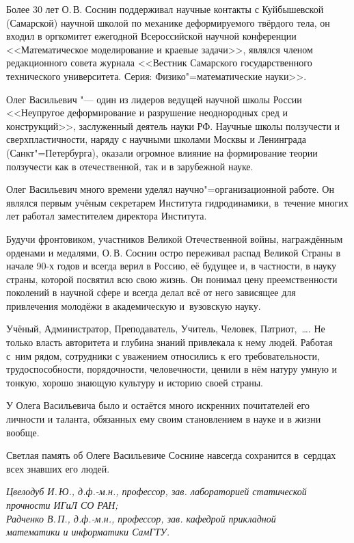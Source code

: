 Более 30 лет О.\,В. Соснин поддерживал научные контакты с Куйбышевской (Самарской) научной школой по механике деформируемого твёрдого тела, он входил в оргкомитет ежегодной Всероссийской научной конференции <<Математическое моделирование и краевые задачи>>,
являлся членом редакционного совета журнала <<Вестник Самарского государственного технического университета. Серия: Физико"=математические науки>>.

Олег Васильевич "--- один из лидеров ведущей научной школы России <<Не\-уп\-ру\-гое деформирование и разрушение неоднородных сред и конструкций>>, заслуженный деятель науки РФ. Научные школы ползучести и сверхпластичности, наряду с научными школами Москвы и Ленинграда (Санкт"=Петербурга), оказали огромное влияние на формирование теории ползучести как в отечественной, так и в зарубежной науке.


Олег Васильевич много времени уделял научно"=организационной работе. 
Он являлся первым учёным секретарем Института гидродинамики, в~течение многих лет работал заместителем директора Института.

Будучи фронтовиком, участников Великой Отечественной войны, награждённым орденами и медалями, О.\,В. Соснин остро переживал распад Великой Страны в начале 90-х годов и всегда верил в Россию, её будущее и, в частности, в науку страны, которой посвятил всю свою жизнь.
Он понимал цену преемственности поколений в научной сфере и всегда делал всё от него зависящее для привлечения молодёжи в академическую и~вузовскую науку.

Учёный, Администратор, Преподаватель, Учитель, Человек, Патриот,~\dots\/. Не только власть авторитета и глубина знаний привлекала к нему людей. Работая с~ним рядом, сотрудники с уважением относились к его требовательности, трудоспособности, порядочности, человечности, ценили в нём натуру умную и тонкую, хорошо знающую культуру и историю своей страны.

У Олега Васильевича было и остаётся много искренних почитателей его личности и таланта, обязанных ему своим становлением в науке и в жизни вообще.

Светлая память об Олеге Васильевиче Соснине навсегда сохранится в~сердцах всех знавших его людей.

\begin{flushright} \it \footnotesize
Цвелодуб И.\,Ю., д.ф.-м.н., профессор, зав. лабораторией статической \\ прочности ИГиЛ СО РАН;\\
Радченко В.\,П., д.ф.-м.н., профессор, зав. кафедрой прикладной \\ математики и информатики СамГТУ.\\

 \end{flushright}

%


